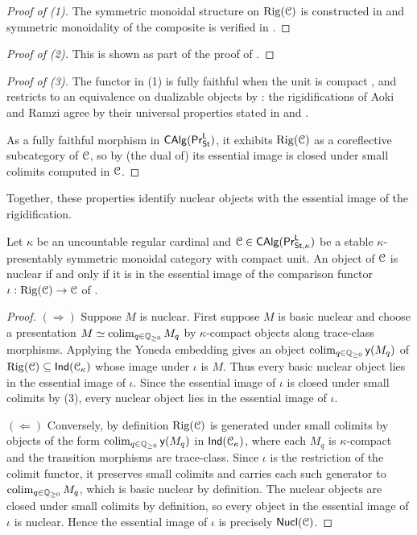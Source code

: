 \begin{proof}[Proof of (1)]
    The symmetric monoidal structure on $\mathrm{Rig}(\EuScript{C})$ is constructed in \cite[Const. 4.79]{RamziLocRigid} and symmetric monoidality of the composite is verified in \cite[Thm. 4.81]{RamziLocRigid}. 
\end{proof}
\begin{proof}[Proof of (2)]
    This is shown as part of the proof of \cite[Thm. 4.81]{RamziLocRigid}. 
\end{proof}
\begin{proof}[Proof of (3)]
    The functor in (1) is fully faithful when the unit is compact \cite[Cor. 4.75 \& Lem. 4.84]{RamziLocRigid}, and restricts to an equivalence on dualizable objects by \cite[Rmk. 7.21]{AokiSchwartz}: the rigidifications of Aoki and Ramzi agree by their universal properties stated in \cite[Cor. 7.20]{AokiSchwartz} and \cite[Thm. 4.81]{RamziLocRigid}. 
    
    As a fully faithful morphism in $\mathsf{CAlg}(\mathsf{Pr}^{\mathsf{L}}_{\mathsf{St}})$, it exhibits $\mathrm{Rig}(\EuScript{C})$ as a coreflective subcategory of $\EuScript{C}$, so by (the dual of) \cite[\href{https://kerodon.net/tag/04JX}{Tag 04JX}]{kerodon} its essential image is closed under small colimits computed in $\EuScript{C}$.
\end{proof}
Together, these properties identify nuclear objects with the essential image of the rigidification. 
\begin{proposition}\label{prop: nuclearity and rigidity}
    Let $\kappa$ be an uncountable regular cardinal and $\EuScript{C}\in\mathsf{CAlg}(\mathsf{Pr}^{\mathsf{L}}_{\mathsf{St},\kappa})$ be a stable $\kappa$-presentably symmetric monoidal category with compact unit. An object of $\EuScript{C}$ is nuclear if and only if it is in the essential image of the comparison functor $\iota:\mathrm{Rig}(\EuScript{C})\to\EuScript{C}$ of . 
\end{proposition}
\begin{proof}
    $(\Rightarrow)$ Suppose $M$ is nuclear. First suppose $M$ is basic nuclear and choose a presentation $M\simeq\operatorname*{colim}_{q\in\mathbb{Q}_{\geq0}}M_{q}$ by $\kappa$-compact objects along trace-class morphisms. Applying the Yoneda embedding gives an object $\operatorname*{colim}_{q\in\mathbb{Q}_{\geq0}}\mathsf{y}(M_{q})$ of $\mathrm{Rig}(\EuScript{C})\subseteq\mathsf{Ind}(\EuScript{C}_{\kappa})$ whose image under $\iota$ is $M$. Thus every basic nuclear object lies in the essential image of $\iota$. Since the essential image of $\iota$ is closed under small colimits by  (3), every nuclear object lies in the essential image of $\iota$.

    $(\Leftarrow)$ Conversely, by definition $\mathrm{Rig}(\EuScript{C})$ is generated under small colimits by objects of the form $\operatorname*{colim}_{q\in\mathbb{Q}_{\geq0}}\mathsf{y}(M_{q})$ in $\mathsf{Ind}(\EuScript{C}_{\kappa})$, where each $M_{q}$ is $\kappa$-compact and the transition morphisms are trace-class. Since $\iota$ is the restriction of the colimit functor, it preserves small colimits and carries each such generator to $\operatorname*{colim}_{q\in\mathbb{Q}_{\geq0}}M_{q}$, which is basic nuclear by definition. The nuclear objects are closed under small colimits by definition, so every object in the essential image of $\iota$ is nuclear. Hence the essential image of $\iota$ is precisely $\mathsf{Nucl}(\EuScript{C})$.
\end{proof}
